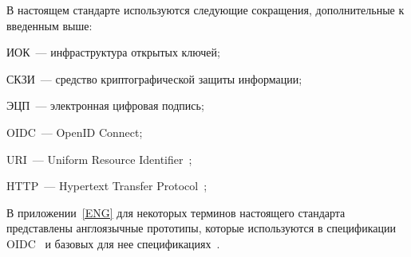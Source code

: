 В настоящем стандарте используются следующие сокращения, дополнительные к 
введенным выше:

ИОК~--- инфраструктура открытых ключей;

СКЗИ~--- средство криптографической защиты информации;

ЭЦП~--- электронная цифровая подпись;

OIDC~--- OpenID Connect;

URI~--- Uniform Resource Identifier~\cite{RFC3986};

HTTP~--- Hypertext Transfer Protocol~\cite{RFC3986};

В приложении~\ref{ENG} для некоторых терминов настоящего стандарта 
представлены англоязычные прототипы, которые используются в 
спецификации OIDC~\cite{OIDC} и базовых для нее 
спецификациях~\cite{RFC6749,RFC6750}.


